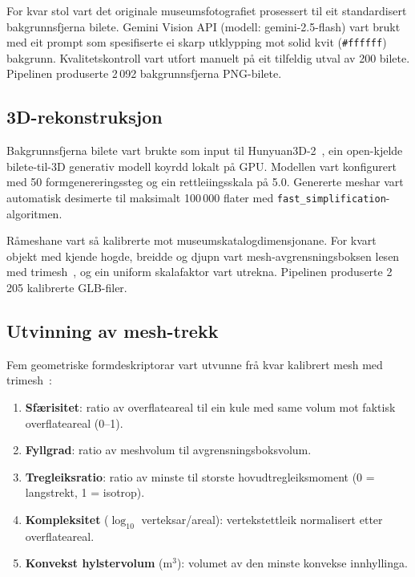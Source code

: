 For kvar stol vart det originale museumsfotografiet prosessert
til eit standardisert bakgrunnsfjerna bilete.
Gemini Vision API (modell: gemini-2.5-flash) vart brukt med eit prompt
som spesifiserte ei skarp utklypping mot solid kvit (\texttt{\#ffffff}) bakgrunn.
Kvalitetskontroll vart utfort manuelt p\aa{} eit tilfeldig utval av 200 bilete.
Pipelinen produserte 2\,092 bakgrunnsfjerna PNG-bilete.

\subsection{3D-rekonstruksjon}

Bakgrunnsfjerna bilete vart brukte som input til Hunyuan3D-2~\cite{hunyuan3d},
ein open-kjelde bilete-til-3D generativ modell koyrdd lokalt p\aa{} GPU.
Modellen vart konfigurert med 50 formgenereringssteg og ein rettleiingsskala p\aa{} 5.0.
Genererte meshar vart automatisk desimerte til maksimalt 100\,000 flater
med \texttt{fast\_simplification}-algoritmen.

R\aa meshane vart s\aa{} kalibrerte mot museumskatalogdimensjonane.
For kvart objekt med kjende hogde, breidde og djupn
vart mesh-avgrensningsboksen lesen med trimesh~\cite{trimesh},
og ein uniform skalafaktor vart utrekna.
Pipelinen produserte 2\,205 kalibrerte GLB-filer.

\subsection{Utvinning av mesh-trekk}

Fem geometriske formdeskriptorar vart utvunne fr\aa{} kvar kalibrert mesh
med trimesh~\cite{trimesh}:

\begin{enumerate}
\item \textbf{Sf\ae risitet}: ratio av overflateareal til ein kule med same volum mot faktisk overflateareal (0--1).
\item \textbf{Fyllgrad}: ratio av meshvolum til avgrensningsboksvolum.
\item \textbf{Tregleiksratio}: ratio av minste til storste hovudtregleiksmoment (0 = langstrekt, 1 = isotrop).
\item \textbf{Kompleksitet} ($\log_{10}$ verteksar/areal): vertekstettleik normalisert etter overflateareal.
\item \textbf{Konvekst hylstervolum} (m$^3$): volumet av den minste konvekse innhyllinga.
\end{enumerate}

